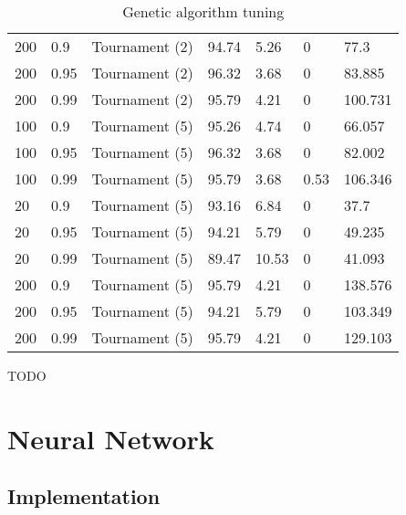 \documentclass[a4paper]{article}
\begin{document}
\begin{table}[h!]
\begin{tabular}{@{}lllllll@{}}
    200             & 0.9         & Tournament (2) & 94.74         & 5.26       & 0                 & 77.3     \\
    200             & 0.95        & Tournament (2) & 96.32         & 3.68       & 0                 & 83.885   \\
    200             & 0.99        & Tournament (2) & 95.79         & 4.21       & 0                 & 100.731  \\
    100             & 0.9         & Tournament (5) & 95.26         & 4.74       & 0                 & 66.057   \\
    100             & 0.95        & Tournament (5) & 96.32         & 3.68       & 0                 & 82.002   \\
    100             & 0.99        & Tournament (5) & 95.79         & 3.68       & 0.53              & 106.346  \\
    20              & 0.9         & Tournament (5) & 93.16         & 6.84       & 0                 & 37.7     \\
    20              & 0.95        & Tournament (5) & 94.21         & 5.79       & 0                 & 49.235   \\
    20              & 0.99        & Tournament (5) & 89.47         & 10.53      & 0                 & 41.093   \\
    200             & 0.9         & Tournament (5) & 95.79         & 4.21       & 0                 & 138.576  \\
    200             & 0.95        & Tournament (5) & 94.21         & 5.79       & 0                 & 103.349  \\
    200             & 0.99        & Tournament (5) & 95.79         & 4.21       & 0                 & 129.103  \\
    \bottomrule
  \end{tabular}
  \caption{Genetic algorithm tuning}
  \label{tab:ga_tuning}
\end{table}

TODO

\section{Neural Network}
\label{sec:nn}

\subsection{Implementation}
\label{sec:nn_implementation}
\end{document}
